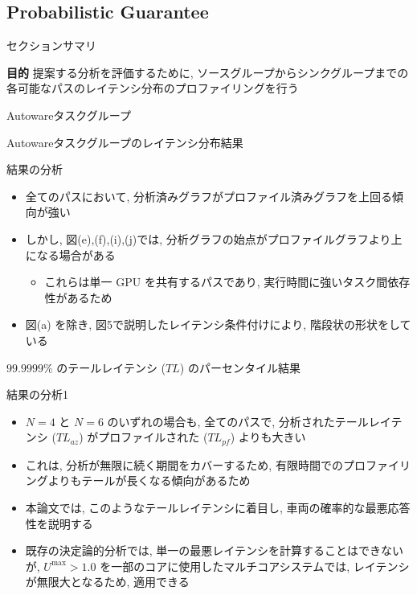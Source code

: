 \subsection{Probabilistic Guarantee}
\label{ssec: probabilistic guarantee}

\begin{frame}{セクションサマリ}
    \begin{itembox}[l]{\textbf{目的}}
        提案する分析を評価するために, ソースグループからシンクグループまでの各可能なパスのレイテンシ分布のプロファイリングを行う
    \end{itembox}
\end{frame}

\begin{frame}{Autowareタスクグループ}
\end{frame}

\begin{frame}{Autowareタスクグループのレイテンシ分布結果}
\end{frame}

\begin{frame}{結果の分析}
    \begin{itemize}
        \item 全てのパスにおいて, 分析済みグラフがプロファイル済みグラフを上回る傾向が強い
        \item しかし, 図(e),(f),(i),(j)では, 分析グラフの始点がプロファイルグラフより上になる場合がある
              \begin{itemize}
                  \item これらは単一 GPU を共有するパスであり, 実行時間に強いタスク間依存性があるため
              \end{itemize}
        \item 図(a) を除き, 図5で説明したレイテンシ条件付けにより, 階段状の形状をしている
    \end{itemize}
\end{frame}

\begin{frame}{$99.9999 \%$ のテールレイテンシ ($TL$) のパーセンタイル結果}
\end{frame}

\begin{frame}{結果の分析1}
    \begin{itemize}
        \item $N=4$ と $N=6$ のいずれの場合も, 全てのパスで, 分析されたテールレイテンシ ($TL_{a z}$) がプロファイルされた ($T L_{p f}$) よりも大きい
        \item これは, 分析が無限に続く期間をカバーするため, 有限時間でのプロファイリングよりもテールが長くなる傾向があるため
        \item 本論文では, このようなテールレイテンシに着目し, 車両の確率的な最悪応答性を説明する
        \item 既存の決定論的分析では, 単一の最悪レイテンシを計算することはできないが, $U^{\max }>1.0$ を一部のコアに使用したマルチコアシステムでは, レイテンシが無限大となるため, 適用できる
    \end{itemize}
\end{frame}

